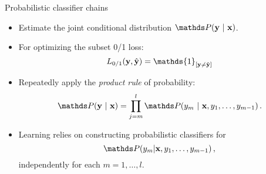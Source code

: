 \documentclass[11pt,compress,t,notes=noshow, xcolor=table]{beamer}
\begin{document}

\begin{frame}{Probabilistic classifier chains}
	
	\begin{itemize}
		\item Estimate the \alert{joint} conditional distribution $\P(\yv ~|~  \xv)$. 
		\item For optimizing the \alert{subset 0/1} loss:  $$ L_{0/1}(\yv, \hat{\yv}) = \mathds{1}_{[\yv \ne \hat{\yv}]}$$
		\item Repeatedly apply the \emph{product rule} of probability:
		$$
		\P(\yv ~|~ \xv) = \prod_{j=m}^{l} \P(y_m ~|~ \xv, y_1, \ldots,y_{m-1}) \, .
		$$
		\item  Learning relies on constructing \alert{probabilistic classifiers} for
		$$
		\P( y_m|\xv, y_1, \ldots,y_{m-1}) \,,
		$$
		{independently} for each $m = 1, \ldots, l$. 
	\end{itemize}
\end{frame}
\end{document}
